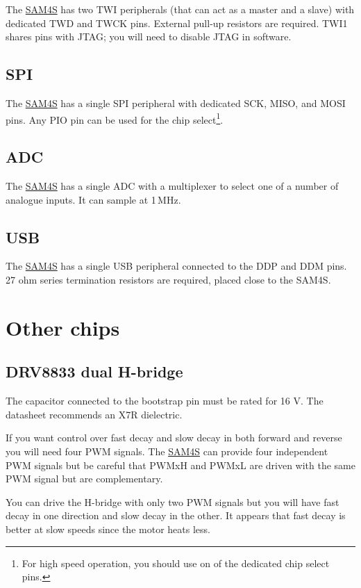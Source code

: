 The \url{SAM4S} has two TWI peripherals (that can act as a master and
a slave) with dedicated TWD and TWCK pins. External pull-up resistors
are required.  TWI1 shares pins with JTAG; you will need to disable
JTAG in software.

\subsection{SPI}\label{spi}

The \url{SAM4S} has a single SPI peripheral with dedicated SCK, MISO,
and MOSI pins. Any PIO pin can be used for the chip
select\footnote{For high speed operation, you should use on of the
  dedicated chip select pins.}.

\subsection{ADC}\label{adc}

The \url{SAM4S} has a single ADC with a multiplexer to select one of a
number of analogue inputs.  It can sample at 1\,MHz.

\subsection{USB}\label{usb}

The \url{SAM4S} has a single USB peripheral connected to the DDP and DDM
pins. 27 ohm series termination resistors are required, placed close to
the SAM4S.

\section{Other chips}\label{other-chips}

\subsection{DRV8833 dual H-bridge}\label{drv8833-dual-h-bridge}

The capacitor connected to the bootstrap pin must be rated for 16 V. The
datasheet recommends an X7R dielectric.

If you want control over fast decay and slow decay in both forward and
reverse you will need four PWM signals. The \url{SAM4S} can provide four
independent PWM signals but be careful that PWMxH and PWMxL are driven
with the same PWM signal but are complementary.

You can drive the H-bridge with only two PWM signals but you will have
fast decay in one direction and slow decay in the other. It appears that
fast decay is better at slow speeds since the motor heats less.

